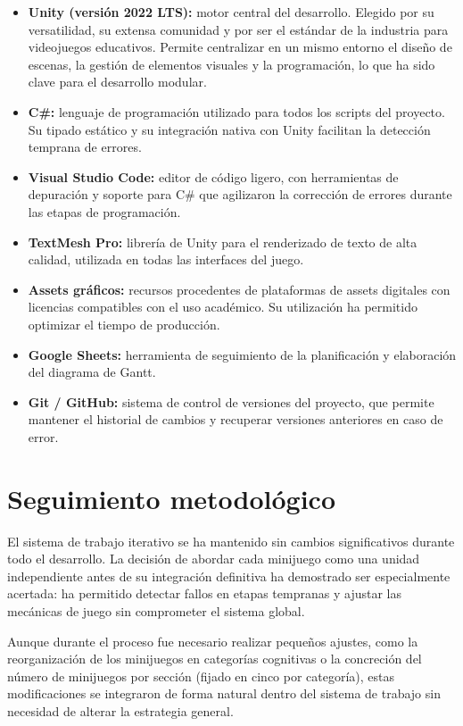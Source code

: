 \documentclass[12pt, a4paper]{report}
\begin{document}
\begin{itemize}
  \item \textbf{Unity (versión 2022 LTS):} motor central del desarrollo.
    Elegido por su versatilidad, su extensa comunidad y por ser el estándar
    de la industria para videojuegos educativos. Permite centralizar en un
    mismo entorno el diseño de escenas, la gestión de elementos visuales y
    la programación, lo que ha sido clave para el desarrollo modular.
  \item \textbf{C\#:} lenguaje de programación utilizado para todos los
    scripts del proyecto. Su tipado estático y su integración nativa con
    Unity facilitan la detección temprana de errores.
  \item \textbf{Visual Studio Code:} editor de código ligero, con herramientas
    de depuración y soporte para C\# que agilizaron la corrección de errores
    durante las etapas de programación.
  \item \textbf{TextMesh Pro:} librería de Unity para el renderizado de texto
    de alta calidad, utilizada en todas las interfaces del juego.
  \item \textbf{Assets gráficos:} recursos procedentes de plataformas de
    assets digitales con licencias compatibles con el uso académico. Su
    utilización ha permitido optimizar el tiempo de producción.
  \item \textbf{Google Sheets:} herramienta de seguimiento de la planificación
    y elaboración del diagrama de Gantt.
  \item \textbf{Git / GitHub:} sistema de control de versiones del proyecto,
    que permite mantener el historial de cambios y recuperar versiones
    anteriores en caso de error.
\end{itemize}

\section{Seguimiento metodológico}

El sistema de trabajo iterativo se ha mantenido sin cambios significativos
durante todo el desarrollo. La decisión de abordar cada minijuego como una
unidad independiente antes de su integración definitiva ha demostrado ser
especialmente acertada: ha permitido detectar fallos en etapas tempranas
y ajustar las mecánicas de juego sin comprometer el sistema global.

Aunque durante el proceso fue necesario realizar pequeños ajustes, como la
reorganización de los minijuegos en categorías cognitivas o la concreción del
número de minijuegos por sección (fijado en cinco por categoría), estas
modificaciones se integraron de forma natural dentro del sistema de trabajo sin
necesidad de alterar la estrategia general.
\end{document}
